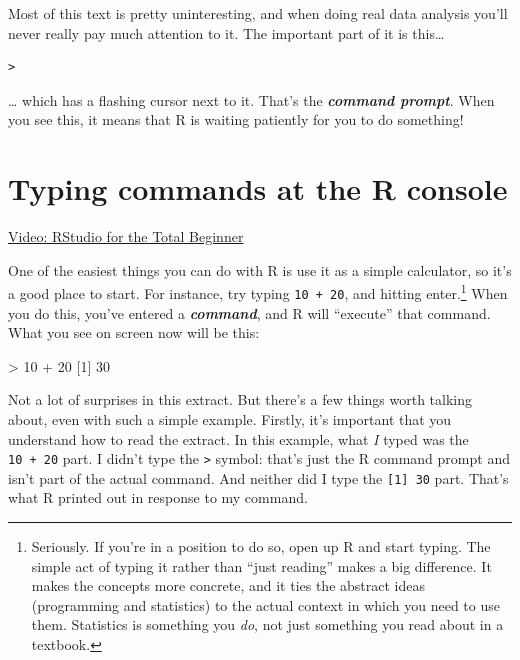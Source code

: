 \documentclass[
]{book}
\newenvironment{Shaded}{\begin{snugshade}}{\end{snugshade}}
\newcommand{\DecValTok}[1]{\textcolor[rgb]{0.00,0.00,0.81}{#1}}
\newcommand{\NormalTok}[1]{#1}
\newcommand{\SpecialCharTok}[1]{\textcolor[rgb]{0.00,0.00,0.00}{#1}}
\begin{document}
Most of this text is pretty uninteresting, and when doing real data analysis you'll never really pay much attention to it. The important part of it is this\ldots{}

\begin{verbatim}
>
\end{verbatim}

\ldots{} which has a flashing cursor next to it. That's the \textbf{\emph{command prompt}}. When you see this, it means that R is waiting patiently for you to do something!

\hypertarget{firstcommand}{%
\section{Typing commands at the R console}\label{firstcommand}}

\href{https://www.youtube.com/watch?v=FIrsOBy5k58}{Video: RStudio for the Total Beginner}

One of the easiest things you can do with R is use it as a simple calculator, so it's a good place to start. For instance, try typing \texttt{10\ +\ 20}, and hitting enter.\footnote{Seriously. If you're in a position to do so, open up R and start typing. The simple act of typing it rather than ``just reading'' makes a big difference. It makes the concepts more concrete, and it ties the abstract ideas (programming and statistics) to the actual context in which you need to use them. Statistics is something you \emph{do}, not just something you read about in a textbook.} When you do this, you've entered a \textbf{\emph{command}}, and R will ``execute'' that command. What you see on screen now will be this:

\begin{Shaded}
\begin{Highlighting}[]
\SpecialCharTok{\textgreater{}} \DecValTok{10} \SpecialCharTok{+} \DecValTok{20}
\NormalTok{[}\DecValTok{1}\NormalTok{] }\DecValTok{30}
\end{Highlighting}
\end{Shaded}

Not a lot of surprises in this extract. But there's a few things worth talking about, even with such a simple example. Firstly, it's important that you understand how to read the extract. In this example, what \emph{I} typed was the \texttt{10\ +\ 20} part. I didn't type the \texttt{\textgreater{}} symbol: that's just the R command prompt and isn't part of the actual command. And neither did I type the \texttt{{[}1{]}\ 30} part. That's what R printed out in response to my command.
\end{document}
